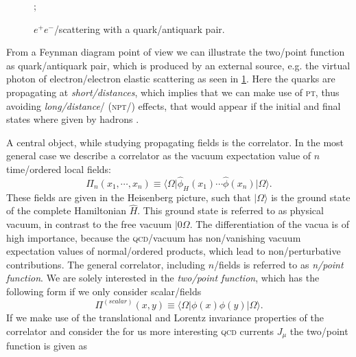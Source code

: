 \documentclass[../../index.tex]{subfiles}
\begin{document}
\begin{figure}
  \centering
  \begin{tkizpicture}
    ;
  \end{tkizpicture}
  \caption{$e^+e^-$\-/scattering with a quark\-/antiquark pair.}
  \label{fig:electronElectronScattering}
\end{figure}
From a Feynman diagram point of view we can illustrate the two\-/point function
as quark\-/antiquark pair, which is produced by an external source, e.g. the
virtual photon of electron\-/electron elastic scattering as seen in \cref{fig:electronElectronScattering}.
Here the quarks are propagating at \textit{short\-/distances}, which implies
that we can make use of \textsc{pt}, thus avoiding \textit{long\-/distance}\-/
(\textsc{npt}\-/) effects, that would appear if the initial and final states
where given by hadrons \cite{Colangelo2000}. 


A central object, while studying propagating fields is the correlator. In the
most general case we describe a correlator as the vacuum expectation value of $n$ time\-/ordered local fields:
\begin{equation}
  \Pi_n(x_1,\cdots,x_n) \equiv \langle\Omega\vert \hat\phi_H(x_1)\cdots\hat\phi(x_n) \vert\Omega\rangle.
\end{equation}
These fields are given in the Heisenberg picture, such that $\vert\Omega\rangle$
is the ground state of the complete Hamiltonian $\hat H$. This ground state is
referred to as physical vacuum, in contrast to the free vacuum $\vert 0 \Omega$.
The differentiation of the vacua is of high importance, because the
\textsc{qcd}\-/vacuum has non\-/vanishing vacuum expectation values of
normal\-/ordered products, which lead to non\-/perturbative contributions.
The general correlator, including $n$\-/fields is referred to as \textit{n\-/point
  function}. We are solely interested in the \textit{two\-/point function},
which has the following form if we only consider scalar\-/fields
\begin{equation}
  \label{eq:simpleTwoPointFunction}
  \Pi^{(scalar)}(x,y) \equiv \langle\Omega\vert \phi(x) \phi(y) \vert\Omega\rangle.
\end{equation}
If we make use of the translational and Lorentz invariance properties of the correlator and
consider the for us more interesting \textsc{qcd} currents $J_\mu$ the
two\-/point function is given as
\end{document}
